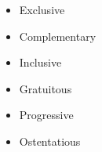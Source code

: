\begin{itemize}
\item{} Exclusive
\vskip 5pt 
\item{} Complementary
\vskip 5pt 
\item{} Inclusive
\vskip 5pt 
\item{} Gratuitous
\vskip 5pt 
\item{} Progressive
\vskip 5pt 
\item{} Ostentatious
\end{itemize}






